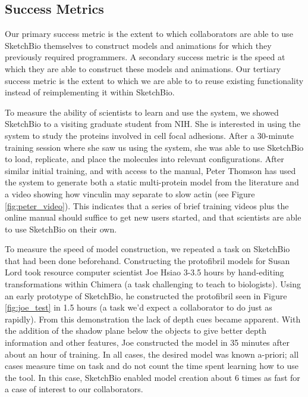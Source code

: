 \documentclass[twocolumn]{bmcart}%
\begin{document}
\subsection*{Success Metrics}
Our primary success metric is the extent to which collaborators are able to use SketchBio themselves to construct models and animations for which they previously required programmers.
A secondary success metric is the speed at which they are able to construct these models and animations.
Our tertiary success metric is the extent to which we are able to to reuse existing functionality instead of reimplementing it within SketchBio.

To measure the ability of scientists to learn and use the system, we showed SketchBio to a visiting graduate student from NIH.  She is interested in using the system to study the proteins involved in cell focal adhesions.
After a 30-minute training session where she saw us using the system, she was able to use SketchBio to load, replicate, and place the molecules into relevant configurations.
After similar initial training, and with access to the manual, Peter Thomson has used the system to generate both a static multi-protein model from the literature and a video showing how vinculin may separate to slow actin (see Figure \ref{fig:peter_video}).
This indicates that a series of brief training videos plus the online manual should suffice to get new users started, and that scientists are able to use SketchBio on their own.

To measure the speed of model construction, we repeated a task on SketchBio that had been done beforehand.
Constructing the protofibril models for Susan Lord took resource computer scientist Joe Hsiao 3-3.5 hours by hand-editing transformations within Chimera (a task challenging to teach to biologists).
Using an early prototype of SketchBio, he constructed the protofibril seen in Figure \ref{fig:joe_test} in 1.5 hours (a task we'd expect a collaborator to do just as rapidly).
From this demonstration the lack of depth cues became apparent.
With the addition of the shadow plane below the objects to give better depth information and other features, Joe constructed the model in 35 minutes after about an hour of training.
In all cases, the desired model was known a-priori; all cases measure time on task and do not count the time spent learning how to use the tool.
In this case, SketchBio enabled model creation about 6 times as fast for a case of interest to our collaborators.
\end{document}
